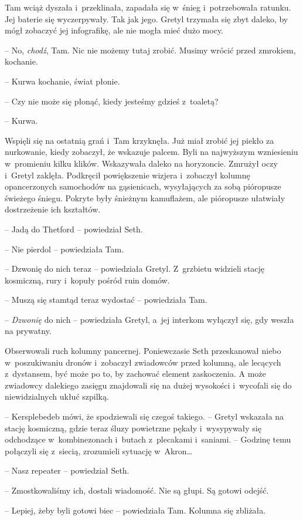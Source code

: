 \documentclass[oneside,polish,11pt,sfheadings]{mwbk}
\begin{document}
Tam wciąż dyszała i~przeklinała, zapadała się w~śnieg i~potrzebowała
ratunku. Jej baterie się wyczerpywały. Tak jak jego. Gretyl trzymała się
zbyt daleko, by mógł zobaczyć jej infografikę, ale nie mogła mieć dużo
mocy.

-- No, \textit{chodź}, Tam. Nic nie możemy tutaj zrobić. Musimy wrócić
przed zmrokiem, kochanie.

-- Kurwa kochanie, świat płonie.

-- Czy nie może się płonąć, kiedy jesteśmy gdzieś z~toaletą?

-- Kurwa.

Wspięli się na ostatnią grań i~Tam krzyknęła. Już miał zrobić jej piekło
za nurkowanie, kiedy zobaczył, że wskazuje palcem. Byli na najwyższym
wzniesieniu w~promieniu kilku klików. Wskazywała daleko na horyzoncie. Zmrużył
oczy i~Gretyl zaklęła. Podkręcił powiększenie wizjera i~zobaczył kolumnę
opancerzonych samochodów na gąsienicach, wysyłających za sobą pióropusze
świeżego śniegu. Pokryte były śnieżnym kamuflażem, ale pióropusze
ułatwiały dostrzeżenie ich kształtów.

-- Jadą do Thetford -- powiedział Seth.

-- Nie pierdol -- powiedziała Tam.

-- Dzwonię do nich teraz -- powiedziała Gretyl. Z~grzbietu widzieli stację
kosmiczną, rury i~kopuły pośród ruin domów.

-- Muszą się stamtąd teraz wydostać -- powiedziała Tam.

-- \textit{Dzwonię} do nich -- powiedziała Gretyl, a~jej interkom wyłączył
się, gdy weszła na prywatny. 

Obserwowali ruch kolumny pancernej.
Poniewczasie Seth przeskanował niebo w~poszukiwaniu dronów i~zobaczył
zwiadowców przed kolumną, ale lecących z~dystansem, być może po to, by
zachować element zaskoczenia. A może zwiadowcy dalekiego zasięgu
znajdowali się na dużej wysokości i~wycofali się do niewidzialnych ukłuć
szpilką.

-- Kersplebedeb mówi, że spodziewali się czegoś takiego. -- Gretyl
wskazała na stację kosmiczną, gdzie teraz śluzy powietrzne pękały i~wysypywały się odchodzące w~kombinezonach i~butach z~plecakami i~saniami. -- Godzinę temu połączyli się z~siecią, zrozumieli sytuację w~Akron\ldots 

-- Nasz repeater -- powiedział Seth.

-- Zmostkowaliśmy ich, dostali wiadomość. Nie są głupi. Są gotowi odejść.

-- Lepiej, żeby byli gotowi biec -- powiedziała Tam. Kolumna się zbliżała.
\end{document}

